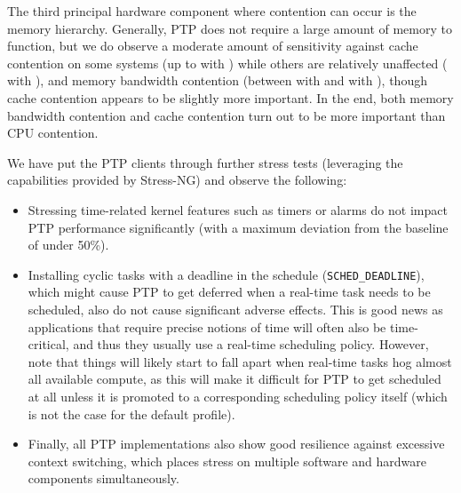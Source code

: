 %
The third principal hardware component where contention can occur is the memory hierarchy. Generally, PTP does not require a large amount of memory to function, but we do observe a moderate amount of sensitivity against cache contention on some systems (up to \fRatio[1]{\cmpMax} with \fVendorCluster{\cmpMaxArg}) while others are relatively unaffected (\fRatio[0]{\cmpMin} with \fVendorCluster{\cmpMinArg}),%
%
%
%
and memory bandwidth contention (between \fRatio[1]{\cmpMin} with \fVendorCluster{\cmpMinArg} and \fRatio{\cmpMax} with \fVendorCluster{\cmpMaxArg}), though cache contention appears to be slightly more important.
%
In the end, both memory bandwidth contention and cache contention turn out to be more important than CPU contention.%
%

We have put the PTP clients through further stress tests (leveraging the capabilities provided by Stress-NG) and observe the following:%
\begin{itemize}
    \item Stressing time-related kernel features such as timers or alarms do not impact PTP performance significantly (with a maximum deviation from the baseline of under 50\%).
    \item Installing cyclic tasks with a deadline in the schedule (\texttt{SCHED\_DEADLINE}), which might cause PTP to get deferred when a real-time task needs to be scheduled, also do not cause significant adverse effects. This is good news as applications that require precise notions of time will often also be time-critical, and thus they usually use a real-time scheduling policy. However, note that things will likely start to fall apart when real-time tasks hog almost all available compute, as this will make it difficult for PTP to get scheduled at all unless it is promoted to a corresponding scheduling policy itself (which is not the case for the default profile).
    \item Finally, all PTP implementations also show good resilience against excessive context switching, which places stress on multiple software and hardware components simultaneously.
\end{itemize}

